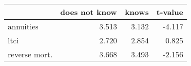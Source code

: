\begin{tabular}{lrrr}
\toprule
{} &  does not know &  knows &  t-value \\
\midrule
annuities     &          3.513 &  3.132 &   -4.117 \\
ltci          &          2.720 &  2.854 &    0.825 \\
reverse mort. &          3.668 &  3.493 &   -2.156 \\
\bottomrule
\end{tabular}
